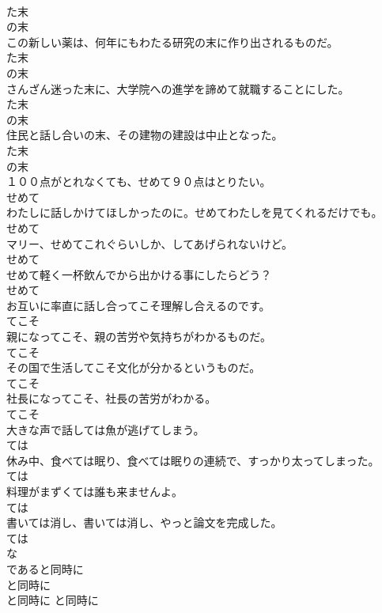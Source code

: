\documentclass[8pt]{extreport}
\begin{document}
\begin{CJK}{UTF8}{min}
\\	た末 
\\	の末
\\	この新しい薬は、何年にもわたる研究の末に作り出されるものだ。	
\\	た末 
\\	の末
\\	さんざん迷った末に、大学院への進学を諦めて就職することにした。	
\\	た末 
\\	の末
\\	住民と話し合いの末、その建物の建設は中止となった。	
\\	た末 
\\	の末
\\	１００点がとれなくても、せめて９０点はとりたい。	
\\	せめて
\\	わたしに話しかけてほしかったのに。せめてわたしを見てくれるだけでも。	
\\	せめて
\\	マリー、せめてこれぐらいしか、してあげられないけど。	
\\	せめて
\\	せめて軽く一杯飲んでから出かける事にしたらどう？	
\\	せめて
\\	お互いに率直に話し合ってこそ理解し合えるのです。	
\\	てこそ
\\	親になってこそ、親の苦労や気持ちがわかるものだ。	
\\	てこそ
\\	その国で生活してこそ文化が分かるというものだ。	
\\	てこそ
\\	社長になってこそ、社長の苦労がわかる。	
\\	てこそ
\\	大きな声で話しては魚が逃げてしまう。	
\\	ては
\\	休み中、食べては眠り、食べては眠りの連続で、すっかり太ってしまった。	
\\	ては
\\	料理がまずくては誰も来ませんよ。	
\\	ては
\\	書いては消し、書いては消し、やっと論文を完成した。	
\\	ては
\\	な
\\	であると同時に	
\\	と同時に	
\\	と同時に	と同時に

\end{CJK}
\end{document}
